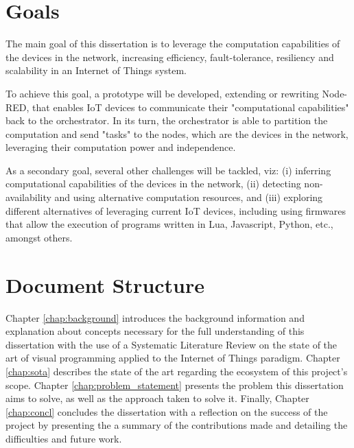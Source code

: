 \section{Goals} \label{sec:goals}

The main goal of this dissertation is to leverage the computation capabilities of the devices in the network, increasing efficiency, fault-tolerance, resiliency and scalability in an Internet of Things system.
\par To achieve this goal, a prototype will be developed, extending or rewriting Node-RED, that enables IoT devices to communicate their "computational capabilities" back to the orchestrator. In its turn, the orchestrator is able to partition the computation and send "tasks" to the nodes, which are the devices in the network, leveraging their computation power and independence.
\par As a secondary goal, several other challenges will be tackled, viz: (i) inferring computational capabilities of the devices in the network, (ii) detecting non-availability and using alternative computation resources, and (iii) exploring different alternatives of leveraging current IoT devices, including using firmwares that allow the execution of programs written in Lua, Javascript, Python, etc., amongst others.

\section{Document Structure} \label{sec:document structure}

Chapter \ref{chap:background} introduces the background information and explanation about concepts necessary for the full understanding of this dissertation with the use of a Systematic Literature Review on the state of the art of visual programming applied to the Internet of Things paradigm. Chapter \ref{chap:sota} describes the state of the art regarding the ecosystem of this project's scope. Chapter \ref{chap:problem_statement} presents the problem this dissertation aims to solve, as well as the approach taken to solve it. Finally, Chapter \ref{chap:concl} concludes the dissertation with a reflection on the success of the project by presenting the a summary of the contributions made and detailing the difficulties and future work.

